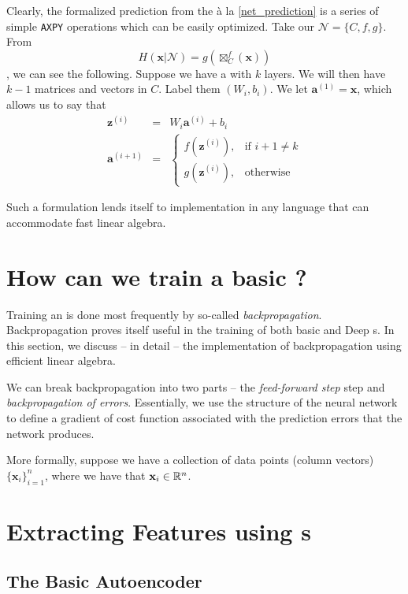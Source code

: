 Clearly, the formalized prediction from the \nn{} \`{a} la \eqref{net_prediction} is a series of simple \texttt{AXPY} operations which can be easily optimized. Take our \nn{} $\mathcal{N}=\{ C, f, g \}$. From $$H(\mathbf{x} | \mathcal{N}) = g(\boxtimes_{C}^{f}(\mathbf{x}))$$, we can see the following. Suppose we have a \nn{} with $k$ layers. We will then have $k-1$ matrices and vectors in $C$. Label them $(W_i, b_i)$. We let $\mathbf{a}^{(1)} = \mathbf{x}$,  which allows us to say that 
\begin{eqnarray}
\mathbf{z}^{(i)} &=& W_i \mathbf{a}^{(i)} + b_i\\
\mathbf{a}^{(i+1)} &=& 
	\begin{cases} 
		f(\mathbf{z}^{(i)}), & \mbox{if } i+1 \neq k \\ 
		g(\mathbf{z}^{(i)}), & \mbox{otherwise}
	\end{cases}
\end{eqnarray}

Such a formulation lends itself to implementation in any language that can accommodate fast linear algebra.

\section{How can we train a basic \ann{}?}
\label{basix}

Training an \ann{} is done most frequently by so-called \emph{backpropagation}. Backpropagation proves itself useful in the training of both basic and Deep \nn{}s. In this section, we discuss -- in detail -- the implementation of backpropagation using efficient linear algebra.

We can break backpropagation into two parts --  the \emph{feed-forward step} step and \emph{backpropagation of errors}. Essentially, we use the structure of the neural network to define a gradient of cost function associated with the prediction errors that the network produces. 

More formally, suppose we have a collection of data points (column vectors) $\{\mathbf{x}_i\}_{i=1}^n$, where we have that $\mathbf{x}_i\in\mathbb{R}^{n}$. 


\section{Extracting Features using \ann{}s}

\subsection{The Basic Autoencoder}


